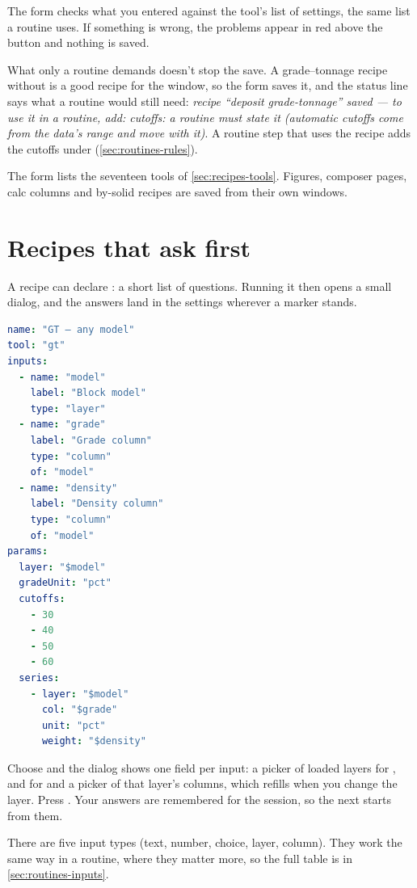 The form checks what you entered against the tool's list of settings, the same list a routine uses. If something is wrong, the problems appear in red above the button and nothing is saved.

What only a routine demands doesn't stop the save. A grade–tonnage recipe without  is a good recipe for the window, so the form saves it, and the status line says what a routine would still need: \emph{recipe “deposit grade-tonnage” saved — to use it in a routine, add: cutoffs: a routine must state it (automatic cutoffs come from the data’s range and move with it)}. A routine step that uses the recipe adds the cutoffs under  (\cref{sec:routines-rules}).

The form lists the seventeen tools of \cref{sec:recipes-tools}. Figures, composer pages, calc columns and by-solid recipes are saved from their own windows.

\section{Recipes that ask first}\label{sec:recipes-inputs}
A recipe can declare : a short list of questions. Running it then opens a small dialog, and the answers land in the settings wherever a  marker stands.

\begin{lstlisting}[language=yaml]
name: "GT — any model"
tool: "gt"
inputs:
  - name: "model"
    label: "Block model"
    type: "layer"
  - name: "grade"
    label: "Grade column"
    type: "column"
    of: "model"
  - name: "density"
    label: "Density column"
    type: "column"
    of: "model"
params:
  layer: "$model"
  gradeUnit: "pct"
  cutoffs:
    - 30
    - 40
    - 50
    - 60
  series:
    - layer: "$model"
      col: "$grade"
      unit: "pct"
      weight: "$density"
\end{lstlisting}


Choose  and the dialog shows one field per input: a picker of loaded layers for , and for  and  a picker of that layer's columns, which refills when you change the layer. Press . Your answers are remembered for the session, so the next  starts from them.

There are five input types (text, number, choice, layer, column). They work the same way in a routine, where they matter more, so the full table is in \cref{sec:routines-inputs}.


